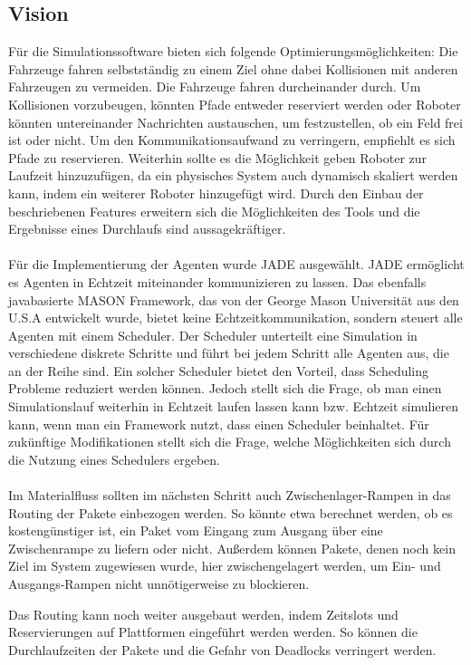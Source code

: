 \subsection{Vision}
Für die Simulationssoftware bieten sich folgende Optimierungsmöglichkeiten: Die Fahrzeuge fahren selbstständig zu einem Ziel ohne dabei Kollisionen mit anderen Fahrzeugen zu vermeiden. Die Fahrzeuge fahren durcheinander durch. Um Kollisionen vorzubeugen, könnten Pfade entweder reserviert werden oder Roboter könnten untereinander Nachrichten austauschen, um festzustellen, ob ein Feld frei ist oder nicht. Um den Kommunikationsaufwand zu verringern, empfiehlt es sich Pfade zu reservieren. Weiterhin sollte es die Möglichkeit geben Roboter zur Laufzeit hinzuzufügen, da ein physisches System auch dynamisch skaliert werden kann, indem ein weiterer Roboter hinzugefügt wird. Durch den Einbau der beschriebenen Features erweitern sich die Möglichkeiten des Tools und die Ergebnisse eines Durchlaufs sind aussagekräftiger.
\\\\
Für die Implementierung der Agenten wurde JADE ausgewählt. JADE ermöglicht es Agenten in Echtzeit miteinander kommunizieren zu lassen. Das ebenfalls javabasierte MASON Framework, das von der George Mason Universität aus den U.S.A entwickelt wurde, bietet keine Echtzeitkommunikation, sondern steuert alle Agenten mit einem Scheduler. Der Scheduler unterteilt eine Simulation in verschiedene diskrete Schritte und führt bei jedem Schritt alle Agenten aus, die an der Reihe sind. Ein solcher Scheduler bietet den Vorteil, dass Scheduling Probleme reduziert werden können. Jedoch stellt sich die Frage, ob man einen Simulationslauf weiterhin in Echtzeit laufen lassen kann bzw. Echtzeit simulieren kann, wenn man ein Framework nutzt, dass einen Scheduler beinhaltet. Für zukünftige Modifikationen stellt sich die Frage, welche Möglichkeiten sich durch die Nutzung eines Schedulers ergeben.
\\\\
Im Materialfluss sollten im nächsten Schritt auch Zwischenlager-Rampen in das Routing der Pakete einbezogen werden. So könnte etwa berechnet werden, ob es kostengünstiger ist, ein Paket vom Eingang zum Ausgang über eine Zwischenrampe zu liefern oder nicht. Außerdem können Pakete, denen noch kein Ziel im System zugewiesen wurde, hier zwischengelagert werden, um Ein- und Ausgangs-Rampen nicht unnötigerweise zu blockieren.

Das Routing kann noch weiter ausgebaut werden, indem Zeitslots und Reservierungen auf Plattformen eingeführt werden werden. So können die Durchlaufzeiten der Pakete und die Gefahr von Deadlocks verringert werden.

